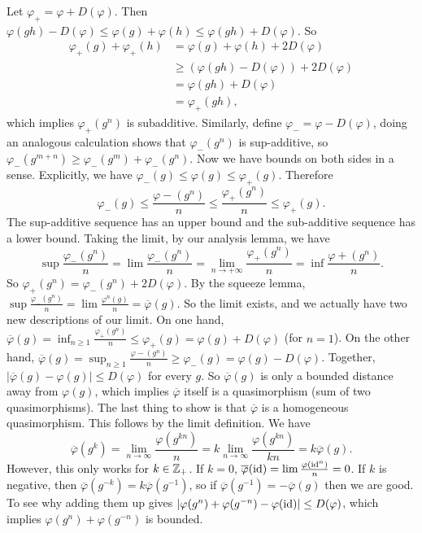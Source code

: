 Let $\varphi _+=\varphi +D(\varphi )$. Then $\varphi (gh)-D(\varphi ) \leq \varphi (g)+\varphi (h) \leq \varphi (gh)+D(\varphi )$. So 
\begin{align*}
    \varphi _+(g)+\varphi _+(h)&= \varphi (g)+\varphi (h) + 2 D(\varphi )\\
                               & \geq \left( \varphi (gh)-D(\varphi ) \right) +2D(\varphi )\\
                               &= \varphi (gh)+D(\varphi )\\
                               &= \varphi_+(gh),
\end{align*}which implies $\varphi_+(g^n )$ is subadditive. Similarly, define $\varphi _-=\varphi -D(\varphi )$, doing an analogous calculation shows that $\varphi _-(g^n )$ is sup-additive, so $\varphi _-(g^{m+n}) \geq \varphi _-(g^m)+\varphi _-(g^n )$. Now we have bounds on both sides in a sense. Explicitly, we have $\varphi _-(g) \leq \varphi (g) \leq \varphi _+(g)$. Therefore \[
\varphi _-(g) \leq \frac{\varphi -(g^n )}{n}\leq \frac{\varphi _+(g^n )}{n}\leq \varphi _+(g).
\] The sup-additive sequence has an upper bound and the sub-additive sequence has a lower bound. Taking the limit, by our analysis lemma, we have \[
\sup \frac{\varphi _-(g^n )}{n}= \lim \frac{\varphi _-(g^n )}{n}=\lim _{n \to +\infty}\frac{\varphi _+(g^n )}{n}= \inf \frac{\varphi +(g^n )}{n}.
\] So $\varphi _+(g^n )= \varphi _-(g^n )+2D(\varphi )$. By the squeeze lemma, $\sup \frac{\varphi _-(g^n )}{n}=\lim \frac{\varphi ^n (g)}{n}= \overline{\varphi }(g)$. So the limit exists, and we actually have two new descriptions of our limit. On one hand, $\overline{\varphi }(g)=\inf _{n\geq 1}\frac{\varphi _+(g^n )}{n}\leq \varphi _+(g)=\varphi (g)+D(\varphi )$ (for $n=1$). On the other hand, $\overline{\varphi }(g)=\sup _{n\geq 1}\frac{\varphi -(g^n )}{n}\geq \varphi _-(g)=\varphi (g)-D(\varphi )$. Together, $|\overline{\varphi }(g)-\varphi (g)| \leq D(\varphi )$ for every $g$. So $\overline{\varphi }(g)$ is only a bounded distance away from $\varphi (g)$, which implies $\overline{\varphi }$ itself is a quasimorphism (sum of two quasimorphisms).
The last thing to show is that $\overline{\varphi }$ is a homogeneous quasimorphism. This follows by the limit definition. We have \[
    \overline{\varphi }(g^k) =\lim _{n\to \infty}\frac{\varphi (g^{kn})}{n}=k \lim _{n \to \infty}\frac{\varphi (g ^{kn})}{kn}=k \overline{\varphi }(g).
\] However, this only works for $k \in \mathbb{Z}_+$. If $k=0$, $\overline{\varphi }(\operatorname{id})=\lim \frac{\varphi (\operatorname{id} ^n )}{n}=0$. If $k $ is negative, then $\overline{\varphi }(g^{-k})=k \overline{\varphi }(g ^{-1})$, so if $\overline{\varphi }(g ^{-1})=- \overline{\varphi }(g)$ then we are good. To see why adding them up gives $|\varphi (g^n )+\varphi (g^{-n}) - \varphi (\operatorname{id})| \leq D(\varphi )$, which implies $\varphi (g^n )+\varphi (g^{-n})$ is bounded. 

